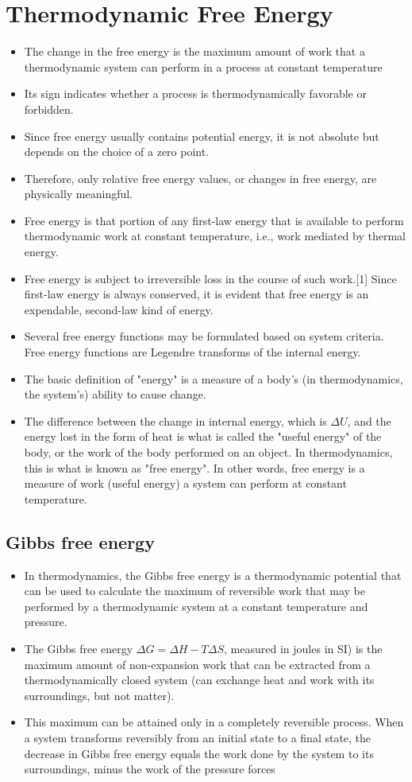 \documentclass[]{article}
\begin{document}
\section{Thermodynamic Free Energy}
\begin{itemize}
\item The change in the free energy is the maximum amount of work that a thermodynamic system can perform in a process at constant temperature
\item Its sign indicates whether a process is thermodynamically favorable or forbidden. 
\item Since free energy usually contains potential energy, it is not absolute but depends on the choice of a zero point. 
\item Therefore, only relative free energy values, or changes in free energy, are physically meaningful.
\item Free energy is that portion of any first-law energy that is available to perform thermodynamic work at constant temperature, i.e., work mediated by thermal energy. 
\item Free energy is subject to irreversible loss in the course of such work.[1] Since first-law energy is always conserved, it is evident that free energy is an expendable, second-law kind of energy.
\item Several free energy functions may be formulated based on system criteria. Free energy functions are Legendre transforms of the internal energy. 
\item The basic definition of "energy" is a measure of a body's (in thermodynamics, the system's) ability to cause change.
\item The difference between the change in internal energy, which is $\Delta U$, and the energy lost in the form of heat is what is called the "useful energy" of the body, or the work of the body performed on an object. In thermodynamics, this is what is known as "free energy". In other words, free energy is a measure of work (useful energy) a system can perform at constant temperature. 
\end{itemize}
\subsection{Gibbs free energy}
\begin{itemize}
\item In thermodynamics, the Gibbs free energy is a thermodynamic potential that can be used to calculate the maximum of reversible work that may be performed by a thermodynamic system at a constant temperature and pressure. 
\item The Gibbs free energy  $\Delta G=\Delta H-T \Delta S$, measured in joules in SI) is the maximum amount of non-expansion work that can be extracted from a thermodynamically closed system (can exchange heat and work with its surroundings, but not matter). 
\item This maximum can be attained only in a completely reversible process. When a system transforms reversibly from an initial state to a final state, the decrease in Gibbs free energy equals the work done by the system to its surroundings, minus the work of the pressure forces
\end{itemize}
\end{document}
